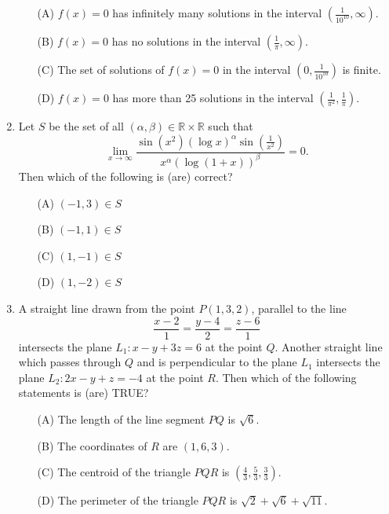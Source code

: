 \documentclass[12pt,a4paper]{article}
\begin{document}
\begin{enumerate}
    \begin{itemize}
        \item[(A)] $ f(x) = 0 $ has infinitely many solutions in the interval $ \left( \frac{1}{10^{10}}, \infty \right) $.
        \item[(B)] $ f(x) = 0 $ has no solutions in the interval $ \left( \frac{1}{\pi}, \infty \right) $.
        \item[(C)] The set of solutions of $ f(x) = 0 $ in the interval $ \left( 0, \frac{1}{10^{10}} \right) $ is finite.
        \item[(D)] $ f(x) = 0 $ has more than 25 solutions in the interval $ \left( \frac{1}{\pi^2}, \frac{1}{\pi} \right) $.
    \end{itemize}
		\item Let $ S $ be the set of all $ (\alpha, \beta) \in \mathbb{R} \times \mathbb{R} $ such that  
\[
    \lim_{x \to \infty} \frac{\sin(x^2)(\log x)^\alpha \sin\left(\frac{1}{x^2}\right)}{x^\alpha (\log(1+x))^\beta} = 0.
\]
    Then which of the following is (are) correct?
    \begin{itemize}
        \item[(A)] $ (-1, 3) \in S $
        \item[(B)] $ (-1, 1) \in S $
        \item[(C)] $ (1, -1) \in S $
        \item[(D)] $ (1, -2) \in S $
    \end{itemize}

    \item A straight line drawn from the point $ P(1, 3, 2) $, parallel to the line  
\[
    \frac{x - 2}{1} = \frac{y - 4}{2} = \frac{z - 6}{1}
\]
    intersects the plane $ L_1: x - y + 3z = 6 $ at the point $ Q $.  
    Another straight line which passes through $ Q $ and is perpendicular to the plane $ L_1 $ intersects the plane $ L_2: 2x - y + z = -4 $ at the point $ R $.  
    Then which of the following statements is (are) TRUE?
    \begin{itemize}
        \item[(A)] The length of the line segment $ PQ $ is $ \sqrt{6} $.
        \item[(B)] The coordinates of $ R $ are $ (1, 6, 3) $.
        \item[(C)] The centroid of the triangle $ PQR $ is $ \left( \frac{4}{3}, \frac{5}{3}, \frac{3}{3} \right) $.
        \item[(D)] The perimeter of the triangle $ PQR $ is $ \sqrt{2} + \sqrt{6} + \sqrt{11} $.
    \end{itemize}


\end{enumerate}
\end{document}
